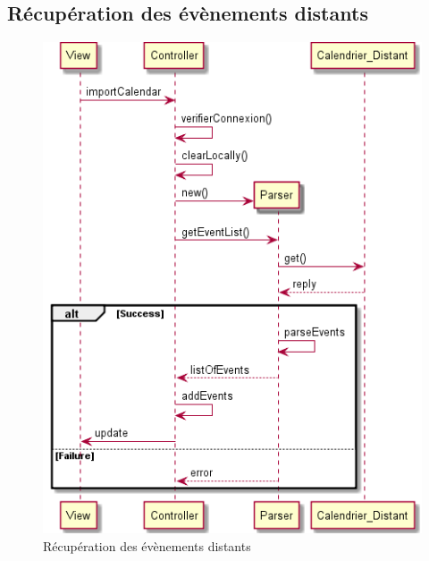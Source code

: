 {		\subsection{Récupération des évènements distants}
			\begin{figure}[!h]
				\centering
				\includegraphics[scale=0.65]{diagseq_getEventList.png}
				\caption{Récupération des évènements distants}
			\end{figure}
			\FloatBarrier
			
}
